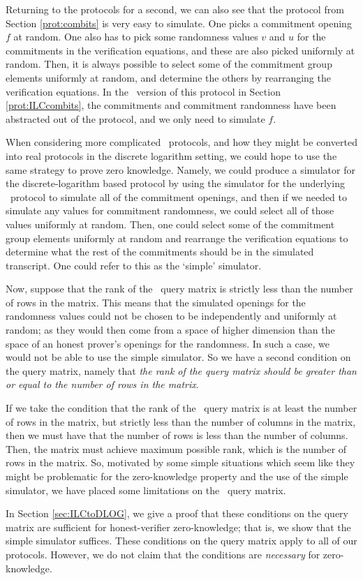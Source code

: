 Returning to the protocols for a second, we can also see that the protocol from Section \ref{prot:combits} is very easy to simulate. One picks a commitment opening $f$ at random. One also has to pick some randomness values $v$ and $u$ for the commitments in the verification equations, and these are also picked uniformly at random. Then, it is always possible to select some of the commitment group elements uniformly at random, and determine the others by rearranging the verification equations. In the \ILC\ version of this protocol in Section \ref{prot:ILCcombits}, the commitments and commitment randomness have been abstracted out of the protocol, and we only need to simulate $f$.

When considering more complicated \ILC\ protocols, and how they might be converted into real protocols in the discrete logarithm setting, we could hope to use the same strategy to prove zero knowledge. Namely, we could produce a simulator for the discrete-logarithm based protocol by using the simulator for the underlying \ILC\ protocol to simulate all of the commitment openings, and then if we needed to simulate any values for commitment randomness, we could select all of those values uniformly at random. Then, one could select some of the commitment group elements uniformly at random and rearrange the verification equations to determine what the rest of the commitments should be in the simulated transcript. One could refer to this as the `simple' simulator.

Now, suppose that the rank of the \ILC\ query matrix is strictly less than the number of rows in the matrix. This means that the simulated openings for the randomness values could not be chosen to be independently and uniformly at random; as they would then come from a space of higher dimension than the space of an honest prover's openings for the randomness. In such a case, we would not be able to use the simple simulator. So we have a second condition on the query matrix, namely that \emph{the rank of the query matrix should be greater than or equal to the number of rows in the matrix}.

If we take the condition that the rank of the \ILC\ query matrix is at least the number of rows in the matrix, but strictly less than the number of columns in the matrix, then we must have that the number of rows is less than the number of columns. Then, the matrix must achieve maximum possible rank,  which is the number of rows in the matrix. So, motivated by some simple situations which seem like they might be problematic for the zero-knowledge property and the use of the simple simulator, we have placed some limitations on the \ILC\ query matrix.

In Section \ref{sec:ILCtoDLOG}, we give a proof that these conditions on the query matrix are sufficient for honest-verifier zero-knowledge; that is, we show that the simple simulator suffices. These conditions on the query matrix apply to all of our protocols. However, we do not claim that the conditions are \emph{necessary} for zero-knowledge.